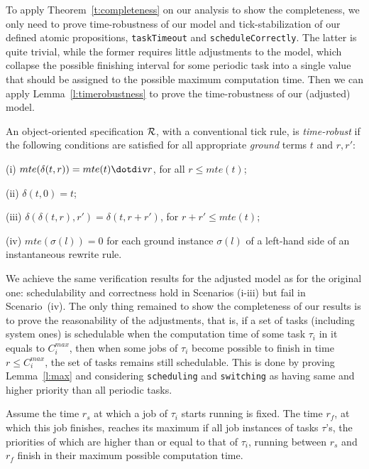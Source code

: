 \documentclass{llncs}
\begin{document}
To apply Theorem~\ref{t:completeness} on our analysis to show the
completeness, we only need to prove time-robustness of our model and
tick-stabilization of our defined atomic propositions,
\verb|taskTimeout| and \verb|scheduleCorrectly|. The latter is quite
trivial, while the former requires little adjustments to the model,
which collapse the possible finishing interval for some periodic task
into a single value that should be assigned to the possible maximum
computation time. Then we can apply Lemma~\ref{l:timerobustness} to
prove the time-robustness of our (adjusted) model.
\begin{lemma}
\label{l:timerobustness}
An object-oriented specification $\cal R$, with a conventional tick
rule, is \emph{time-robust} if the following conditions are satisfied
for all appropriate \emph{ground} terms $t$ and $r,r'$:

\noindent
(i) $mte(\delta(t,r))=mte(t)\dotdiv r$, for all $r\le mte(t)$;

\noindent
(ii) $\delta(t,0)=t$;

\noindent
(iii) $\delta(\delta(t,r),r')=\delta(t,r+r')$, for $r+r'\le mte(t)$;

\noindent
(iv) $mte(\sigma(l))=0$ for each ground instance $\sigma(l)$ of a
left-hand side of an instantaneous rewrite rule.
\end{lemma}

We achieve the same verification results for the adjusted model as for
the original one: schedulability and correctness hold in Scenarios
(i-iii) but fail in Scenario~(iv). The only thing remained to show the
completeness of our results is to prove the reasonability of the
adjustments, that is, if a set of tasks (including system ones) is
schedulable when the computation time of some task $\tau_i$ in it
equals to $C_i^{max}$, then when some jobs of $\tau_i$ become possible
to finish in time $r\le C_i^{max}$, the set of tasks remains still
schedulable. This is done by proving Lemma~\ref{l:max} and considering
\verb|scheduling| and \verb|switching| as having same and higher
priority than all periodic tasks.
\begin{lemma}
\label{l:max}
Assume the time $r_s$ at which a job of $\tau_i$ starts running is
fixed. The time $r_f$, at which this job finishes, reaches its maximum
if all job instances of tasks $\tau$'s, the priorities of which are
higher than or equal to that of $\tau_i$, running between $r_s$ and
$r_f$ finish in their maximum possible computation time.
\end{lemma}
\end{document}
